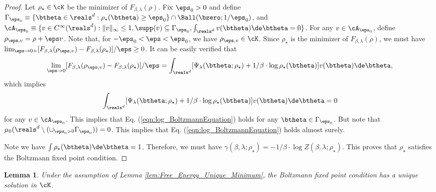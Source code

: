 \documentclass[11pt]{article}
\newtheorem{lemma}{Lemma}
\begin{document}
\begin{proof}
Let $\rho_\star \in \cK$ be the minimizer of $F_{\beta, \lambda}(\rho)$.
Fix $\eps_0 > 0$  and define $\Gamma_{\eps_0} \equiv \{\btheta \in \reals^d: \rho_\star(\btheta) \ge \eps_0 \} \cap \Ball(\bzero; 1/\eps_0)$, and $\cA_{\eps_0} \equiv \{ v \in C^\infty(\reals^d):
\|v\|_{\infty}\le 1, \supp(v) \subseteq \Gamma_{\eps_0},\int_{\reals^d} v(\btheta) \de \btheta = 0\}$.
For any $v \in \cA_{\eps_0}$, define $\rho_{\eps, v} = \rho + \eps v$. Note that, for  $-\eps_0 < \eps < \eps_0$, we have $\rho_{\eps, v} \in \cK$. Since $\rho_\star$ is the minimizer of $F_{\beta, \lambda}(\rho)$, we must have $\lim_{\eps \to 0+} [F_{\beta, \lambda}(\rho_{\eps, v}) - F_{\beta, \lambda}(\rho_\star)]/\eps \ge 0$. It can be easily verified that 
\[
\begin{aligned}
\lim_{\eps \to 0} [F_{\beta, \lambda}(\rho_{\eps, v}) - F_{\beta, \lambda}(\rho_\star)]/\eps = \int_{\reals^d} [\Psi_\lambda(\btheta; \rho_\star) + 1/\beta \cdot \log \rho_\star(\btheta) ] v(\btheta) \de \btheta, 
\end{aligned}
\]
which implies
\begin{align}\label{eqn:Variation_of_F}
\int_{\reals^d} [\Psi_\lambda(\btheta; \rho_\star) + 1/\beta \cdot \log \rho_\star(\btheta) ] v(\btheta) \de \btheta = 0
\end{align}
for any $v \in \cA_{\eps_0}$. This implies that Eq. (\ref{eqn:log_BoltzmannEquation}) holds for any $\btheta \in \Gamma_{\eps_0}$. But note that $\mu_0(\reals^d \setminus(\cup_{\eps_0 > 0} \Gamma_{\eps_0}) ) = 0$. This implies that Eq. (\ref{eqn:log_BoltzmannEquation}) holds almost surely. 

Note we have $\int \rho_\star(\btheta) \de \btheta = 1$. Therefore, we must have $\gamma(\beta, \lambda; \rho_\star) = - 1/\beta \cdot \log Z(\beta, \lambda; \rho_\star)$. This proves that $\rho_\star$ satisfies the Boltzmann fixed point condition. 

\end{proof}


\begin{lemma}\label{lem:Unique_Boltzmann_solution}
Under the assumption of Lemma \ref{lem:Free_Energy_Unique_Minimum}, the Boltzmann fixed point condition has a unique solution in $\cK$.
\end{lemma}
\end{document}
